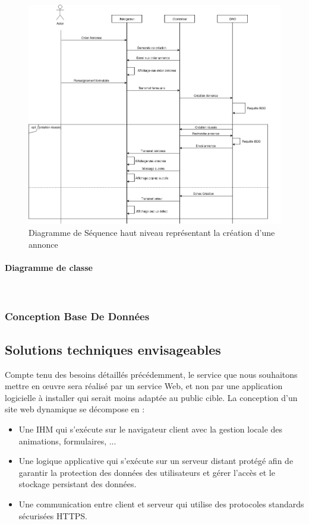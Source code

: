 \documentclass[a4paper,11pt]{article}
\begin{document}
\begin{figure}[H]
  \includegraphics[width=\linewidth]{../Conception/DS_annonce.png}
  \caption{Diagramme de Séquence haut niveau représentant la création d'une annonce}
  \label{fig:<un-label-court>}
\end{figure}

\paragraph{Diagramme de classe}\mbox{} \\


\subsubsection{Conception Base De Données}


\subsection{Solutions techniques envisageables}

Compte tenu des besoins détaillés précédemment, le service que nous souhaitons mettre en œuvre
sera réalisé par un service Web, et non par une application logicielle à installer qui serait moins
adaptée au public cible. La conception d’un site web dynamique se décompose en : \\

\begin{itemize}
  \item Une IHM qui s’exécute sur le navigateur client avec la gestion locale des animations, formulaires, ...
  \item Une logique applicative qui s’exécute sur un serveur distant protégé afin de garantir la protection
  des données des utilisateurs et gérer l’accès et le stockage persistant des données.
  \item Une communication entre client et serveur qui utilise des protocoles standards sécurisées HTTPS.
\end{itemize}
\end{document}
